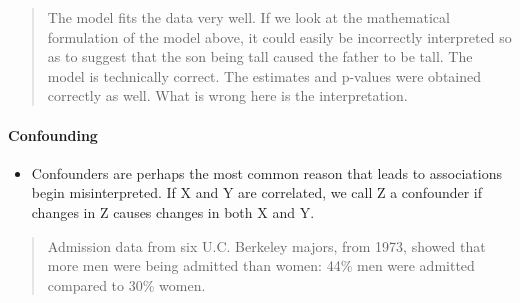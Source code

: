 \documentclass[]{article}
\newenvironment{Shaded}{\begin{snugshade}}{\end{snugshade}}
\newcommand{\DataTypeTok}[1]{\textcolor[rgb]{0.13,0.29,0.53}{#1}}
\newcommand{\DecValTok}[1]{\textcolor[rgb]{0.00,0.00,0.81}{#1}}
\newcommand{\KeywordTok}[1]{\textcolor[rgb]{0.13,0.29,0.53}{\textbf{#1}}}
\newcommand{\NormalTok}[1]{#1}
\newcommand{\OperatorTok}[1]{\textcolor[rgb]{0.81,0.36,0.00}{\textbf{#1}}}
\newcommand{\StringTok}[1]{\textcolor[rgb]{0.31,0.60,0.02}{#1}}
\providecommand{\tightlist}{%
  \setlength{\itemsep}{0pt}\setlength{\parskip}{0pt}}
\let\oldparagraph\paragraph
\renewcommand{\paragraph}[1]{\oldparagraph{#1}\mbox{}}
\begin{document}
\begin{quote}
The model fits the data very well. If we look at the mathematical
formulation of the model above, it could easily be incorrectly
interpreted so as to suggest that the son being tall caused the father
to be tall. The model is technically correct. The estimates and p-values
were obtained correctly as well. What is wrong here is the
interpretation.
\end{quote}

\hypertarget{confounding}{%
\paragraph{Confounding}\label{confounding}}

\begin{itemize}
\tightlist
\item
  Confounders are perhaps the most common reason that leads to
  associations begin misinterpreted. If X and Y are correlated, we call
  Z a confounder if changes in Z causes changes in both X and Y.
\end{itemize}

\begin{quote}
Admission data from six U.C. Berkeley majors, from 1973, showed that
more men were being admitted than women: 44\% men were admitted compared
to 30\% women.
\end{quote}

\begin{Shaded}
\end{Shaded}
\end{document}
